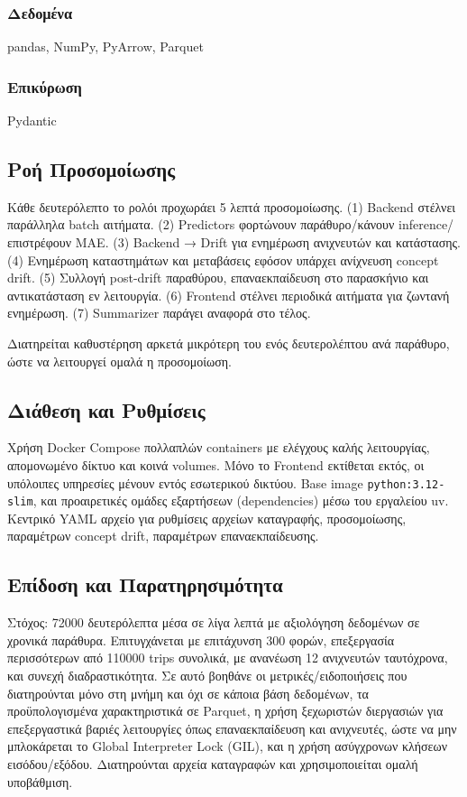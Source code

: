 \subsubsection*{Δεδομένα}
pandas, NumPy, PyArrow, Parquet

\subsubsection*{Επικύρωση}
Pydantic

\subsection*{Ροή Προσομοίωσης}
Κάθε δευτερόλεπτο το ρολόι προχωράει 5 λεπτά προσομοίωσης.
(1) Backend στέλνει παράλληλα batch αιτήματα.
(2) Predictors φορτώνουν παράθυρο/κάνουν inference/επιστρέφουν MAE.
(3) Backend → Drift για ενημέρωση ανιχνευτών και κατάστασης.
(4) Ενημέρωση καταστημάτων και μεταβάσεις εφόσον υπάρχει ανίχνευση concept drift.
(5) Συλλογή post-drift παραθύρου, επαναεκπαίδευση στο παρασκήνιο και αντικατάσταση εν λειτουργία.
(6) Frontend στέλνει περιοδικά αιτήματα για ζωντανή ενημέρωση.
(7) Summarizer παράγει αναφορά στο τέλος.

Διατηρείται καθυστέρηση αρκετά μικρότερη του ενός δευτερολέπτου ανά παράθυρο, ώστε να λειτουργεί ομαλά η προσομοίωση.

\subsection*{Διάθεση και Ρυθμίσεις}
Χρήση Docker Compose πολλαπλών containers με ελέγχους καλής λειτουργίας, απομονωμένο δίκτυο και κοινά volumes.
Μόνο το Frontend εκτίθεται εκτός, οι υπόλοιπες υπηρεσίες μένουν εντός εσωτερικού δικτύου.
Base image \texttt{python:3.12-slim}, και προαιρετικές ομάδες εξαρτήσεων (dependencies) μέσω του εργαλείου uv. Κεντρικό YAML αρχείο για ρυθμίσεις αρχείων καταγραφής, προσομοίωσης, παραμέτρων concept drift, παραμέτρων επαναεκπαίδευσης.

\subsection*{Επίδοση και Παρατηρησιμότητα}
Στόχος: 72000 δευτερόλεπτα μέσα σε λίγα λεπτά με αξιολόγηση δεδομένων σε χρονικά παράθυρα.
Επιτυγχάνεται με επιτάχυνση 300 φορών, επεξεργασία περισσότερων από 110000 trips συνολικά, με ανανέωση 12 ανιχνευτών ταυτόχρονα, και συνεχή διαδραστικότητα.
Σε αυτό βοηθάνε οι μετρικές/ειδοποιήσεις που διατηρούνται μόνο στη μνήμη και όχι σε κάποια βάση δεδομένων, τα προϋπολογισμένα χαρακτηριστικά σε Parquet, η χρήση ξεχωριστών διεργασιών για επεξεργαστικά βαριές λειτουργίες όπως επαναεκπαίδευση και ανιχνευτές, ώστε να μην μπλοκάρεται το Global Interpreter Lock (GIL), και η χρήση ασύγχρονων κλήσεων εισόδου/εξόδου.
Διατηρούνται αρχεία καταγραφών και χρησιμοποιείται ομαλή υποβάθμιση.

